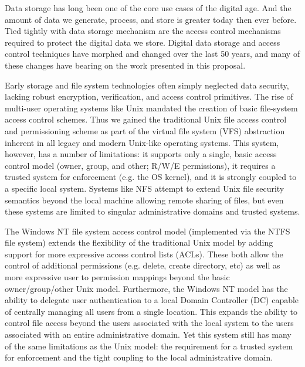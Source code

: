 Data storage has long been one of the core use cases of the digital
age. And the amount of data we generate, process, and store is greater
today then ever before. Tied tightly with data storage mechanism are
the access control mechanisms required to protect the digital data we
store. Digital data storage and access control techniques have morphed
and changed over the last 50 years, and many of these changes have
bearing on the work presented in this proposal.

Early storage and file system technologies often simply neglected data
security, lacking robust encryption, verification, and access control
primitives. The rise of multi-user operating systems like Unix
mandated the creation of basic file-system access control
schemes. Thus we gained the traditional Unix file access control and
permissioning scheme as part of the virtual file system (VFS)
abstraction inherent in all legacy and modern Unix-like operating
systems. This system, however, has a number of limitations: it
supports only a single, basic access control model (owner, group, and
other; R/W/E permissions), it requires a trusted system for
enforcement (e.g. the OS kernel), and it is strongly coupled to a
specific local system. Systems like NFS attempt to extend Unix file
security semantics beyond the local machine allowing remote sharing of
files, but even these systems are limited to singular administrative
domains and trusted systems.

The Windows NT file system access control model (implemented via the
NTFS file system) extends the flexibility of the traditional Unix
model by adding support for more expressive access control lists
(ACLs). These both allow the control of additional permissions
(e.g. delete, create directory, etc) as well as more expressive user
to permission mappings beyond the basic owner/group/other Unix
model. Furthermore, the Windows NT model has the ability to delegate
user authentication to a local Domain Controller (DC) capable of
centrally managing all users from a single location. This expands the
ability to control file access beyond the users associated with the
local system to the users associated with an entire administrative
domain. Yet this system still has many of the same limitations as the
Unix model: the requirement for a trusted system for enforcement and
the tight coupling to the local administrative domain.


